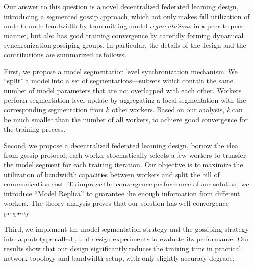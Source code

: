 Our answer to this question is a novel decentralized federated learning design, introducing a segmented gossip approach, which not only makes full utilization of node-to-node bandwidth by transmitting model \emph{segmentations} in a peer-to-peer manner, but also has good training convergence by carefully forming dynamical synchronization gossiping groups. In particular, the details of the design and the contributions are summarized as follows.

First, we propose a model segmentation level synchronization mechanism. We ``split'' a model into a set of segmentations---subsets which contain the same number of model parameters that are not overlapped with each other. Workers perform segmentation level update by aggregating a local segmentation with the corresponding segmentation from $k$ other workers. Based on our analysis, $k$ can be much smaller than the number of all workers, to achieve good convergence for the training process. 


Second, we propose a decentralized federated learning design, borrow the idea from gossip protocol; each worker stochastically selects a few workers to transfer the model segment for each training iteration. Our objective is to maximize the utilization of bandwidth capacities between workers and split the bill of communication cost. To improve the convergence performance of our solution, we introduce ``Model Replica'' to guarantee the enough information from different workers. The theory analysis proves that our solution has well convergence property.

Third, we implement the model segmentation strategy and the gossiping strategy into a prototype called \sys, and design experiments to evaluate its performance. Our results show that our design significantly reduces the training time in practical network topology and bandwidth setup, with only slightly accuracy degrade. 




